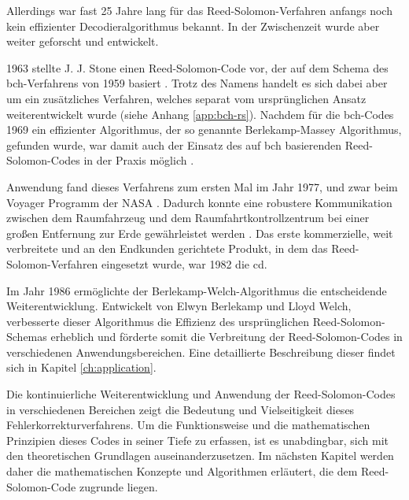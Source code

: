 Allerdings war fast 25 Jahre lang für das Reed-Solomon-Verfahren anfangs noch kein effizienter Decodieralgorithmus bekannt.
In der Zwischenzeit wurde aber weiter geforscht und entwickelt.

1963 stellte J. J. Stone einen Reed-Solomon-Code vor, der auf dem Schema des \acrfull{bch}-Verfahrens von 1959 basiert \cite{petersonErrorcorrectingCodes1972}.
Trotz des Namens handelt es sich dabei aber um ein zusätzliches Verfahren, welches separat vom ursprünglichen Ansatz weiterentwickelt wurde (siehe Anhang \ref{app:bch-rs}).
Nachdem für die \acrshort{bch}-Codes 1969 ein effizienter Algorithmus, der so genannte Berlekamp-Massey Algorithmus, gefunden wurde, war damit auch der Einsatz des auf \acrshort{bch} basierenden Reed-Solomon-Codes in der Praxis möglich \cite{berlekampNonbinaryBCHDecoding1968, masseyShiftregisterSynthesisBCH1969}.

Anwendung fand dieses Verfahrens zum ersten Mal im Jahr 1977, und zwar beim Voyager Programm der NASA \cite{wickerReedSolomonCodes1994}. 
Dadurch konnte eine robustere Kommunikation zwischen dem Raumfahrzeug und dem Raumfahrtkontrollzentrum bei einer großen Entfernung zur Erde gewährleistet werden \cite{ludwigVoyagerTelecommunications2002}.
Das erste kommerzielle, weit verbreitete und an den Endkunden gerichtete Produkt, in dem das Reed-Solomon-Verfahren eingesetzt wurde, war 1982 die \acrfull{cd}.

Im Jahr 1986 ermöglichte der Berlekamp-Welch-Algorithmus die entscheidende Weiterentwicklung.
Entwickelt von Elwyn Berlekamp und Lloyd Welch, verbesserte dieser Algorithmus die Effizienz des ursprünglichen Reed-Solomon-Schemas erheblich und förderte somit die Verbreitung der Reed-Solomon-Codes in verschiedenen Anwendungsbereichen. 
Eine detaillierte Beschreibung dieser findet sich in Kapitel \ref{ch:application}.

Die kontinuierliche Weiterentwicklung und Anwendung der Reed-Solomon-Codes in verschiedenen Bereichen zeigt die Bedeutung und Vielseitigkeit dieses Fehlerkorrekturverfahrens. 
Um die Funktionsweise und die mathematischen Prinzipien dieses Codes in seiner Tiefe zu erfassen, ist es unabdingbar, sich mit den theoretischen Grundlagen auseinanderzusetzen. 
Im nächsten Kapitel werden daher die mathematischen Konzepte und Algorithmen erläutert, die dem Reed-Solomon-Code zugrunde liegen.